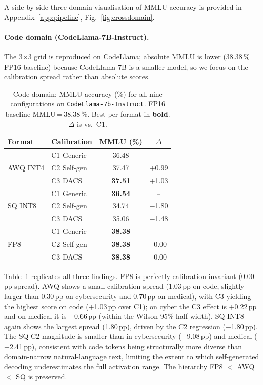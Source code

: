 \documentclass[11pt]{article}
\newcommand{\dacs}{DACS}
\begin{document}
\begin{sloppypar}
A side-by-side three-domain visualisation of MMLU accuracy is
provided in Appendix~\ref{app:pipeline}, Fig.~\ref{fig:crossdomain}.
\end{sloppypar}

\paragraph{Code domain (CodeLlama-7B-Instruct).}
The 3$\times$3 grid is reproduced on CodeLlama; absolute MMLU is
lower (38.38\,\% FP16 baseline) because CodeLlama-7B is a smaller
model, so we focus on the calibration spread rather than absolute
scores.

\begin{table}[h]
\centering
\caption{Code domain: MMLU accuracy (\%) for all nine configurations on
         \texttt{CodeLlama-7b-Instruct}.  FP16 baseline MMLU\,=\,38.38\,\%.
         Best per format in \textbf{bold}.  $\Delta$ is vs.\ C1.}
\label{tab:code}
\small
\begin{tabular}{llcc}
\toprule
\textbf{Format} & \textbf{Calibration} & \textbf{MMLU (\%)} & $\Delta$ \\
\midrule
\multirow{3}{*}{AWQ INT4}
  & C1 Generic  & 36.48 & -- \\
  & C2 Self-gen & 37.47 & $+$0.99 \\
  & C3 \dacs{}  & \textbf{37.51} & $+$1.03 \\
\midrule
\multirow{3}{*}{SQ INT8}
  & C1 Generic  & \textbf{36.54} & -- \\
  & C2 Self-gen & 34.74 & $-$1.80 \\
  & C3 \dacs{}  & 35.06 & $-$1.48 \\
\midrule
\multirow{3}{*}{FP8}
  & C1 Generic  & \textbf{38.38} & -- \\
  & C2 Self-gen & \textbf{38.38} & $~~$0.00 \\
  & C3 \dacs{}  & \textbf{38.38} & $~~$0.00 \\
\bottomrule
\end{tabular}
\end{table}

Table~\ref{tab:code} replicates all three findings.  FP8 is perfectly
calibration-invariant (0.00\,pp spread).  AWQ shows a small calibration
spread (1.03\,pp on code, slightly larger than 0.30\,pp on cybersecurity
and 0.70\,pp on medical), with C3 yielding the highest score on code
($+$1.03\,pp over C1); on cyber the C3 effect is $+$0.22\,pp and on
medical it is $-$0.66\,pp (within the Wilson 95\% half-width).
SQ INT8 again shows the largest spread (1.80\,pp), driven by the C2
regression ($-$1.80\,pp).  The SQ C2 magnitude is smaller than in
cybersecurity ($-$9.08\,pp) and medical ($-$2.41\,pp), consistent with code
tokens being structurally more diverse than domain-narrow natural-language
text, limiting the extent to which self-generated decoding underestimates
the full activation range.  The hierarchy FP8 $<$ AWQ $<$ SQ is preserved.
\end{document}
